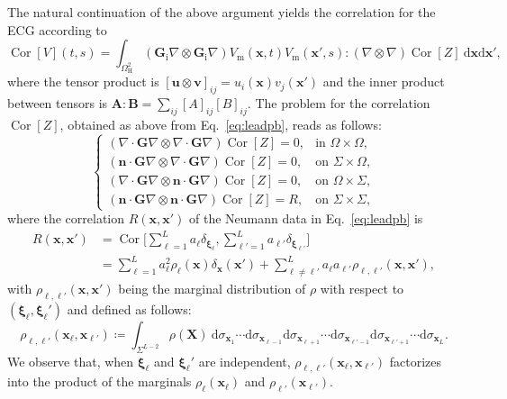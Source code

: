 \documentclass[runningheads]{llncs}
\newcommand{\bs}[1]{\boldsymbol{#1}}
\newcommand{\Vm}{V_\mathrm{m}}
\newcommand{\vX}{\mathbf{X}}
\newcommand{\vx}{\mathbf{x}}
\newcommand{\vn}{\mathbf{n}}
\newcommand{\tG}{\mathbf{G}}
\newcommand{\tGi}{\tG_\mathrm{i}}
\newcommand{\dd}{\mathrm{d}}
\newcommand{\OmegaH}{\Omega_\mathrm{H}}
\DeclareMathOperator{\Cor}{Cor}
\begin{document}
The natural continuation of the above argument yields the correlation for
the ECG according to
\[
\Cor[V](t,s) 
= \int_{\OmegaH^2} (\tGi\nabla\otimes\tGi\nabla) \Vm(\vx,t)\Vm(\vx',s)
: (\nabla\otimes\nabla) \Cor[Z]\: \dd\vx\dd\vx',
\]
where the tensor product is $[\mathbf{u}\otimes\mathbf{v}]_{ij} = u_i(\vx)
v_j(\vx')$ and the inner product between tensors is $\mathbf{A}:\mathbf{B}
= \sum_{ij} [A]_{ij} [B]_{ij}$.  The problem for the correlation $\Cor[Z]$,
obtained as above from Eq.~\eqref{eq:leadpb}, reads as follows:
\begin{equation}\label{eq:leadpb_cor}
\begin{cases}
(\nabla\cdot\tG\nabla\otimes \nabla\cdot\tG\nabla) \Cor[Z] = 0, & \text{in }
\Omega\times\Omega, \\
(\vn\cdot\tG\nabla \otimes \nabla\cdot\tG\nabla) \Cor[Z] = 0, &
\text{on } \Sigma\times\Omega, \\
(\nabla\cdot\tG\nabla \otimes \vn\cdot\tG\nabla) \Cor[Z] = 0, &
\text{on } \Omega\times\Sigma, \\
(\vn\cdot\tG\nabla \otimes \vn\cdot\tG\nabla) \Cor[Z] = R, &
\text{on }\Sigma\times\Sigma,
\end{cases}
\end{equation}
where the correlation $R(\vx,\vx')$ of the Neumann data in
Eq.~\eqref{eq:leadpb} is
\begin{equation}
\begin{split}
R(\vx,\vx') &= \Cor\biggl[\sum_{\ell=1}^L a_\ell \delta_{{\bs\xi}_\ell},
\sum_{\ell'=1}^L a_{\ell'} \delta_{{\bs\xi}_{\ell'}} \biggr] \\
&= \sum_{\ell=1}^L a_\ell^2 \rho_\ell(\vx)\delta_{\vx}(\vx')
+ \sum_{\ell\neq\ell'}^L a_\ell a_{\ell'} \rho_{\ell,\ell'}(\vx,\vx'),
\end{split}
\end{equation}
with $\rho_{\ell,\ell'}(\vx,\vx')$ being the marginal distribution
of $\rho$ with respect to $(\bs\xi_\ell,\bs\xi_\ell')$ and defined
as follows:
\begin{equation} \label{eq:margin2}
\rho_{\ell,\ell'}(\vx_\ell,\vx_{\ell'}) \coloneqq
\int_{\Sigma^{L-2}} \rho(\vX)\:\dd\sigma_{\vx_1}
\cdots \dd\sigma_{\vx_{\ell-1}}\dd\sigma_{\vx_{\ell+1}}
\cdots \dd\sigma_{\vx_{\ell'-1}}\dd\sigma_{\vx_{\ell'+1}}\cdots
\dd\sigma_{\vx_L}.
\end{equation}
We observe that, when $\bs\xi_\ell$ and $\bs\xi_\ell'$ are independent,
$\rho_{\ell,\ell'}(\vx_\ell,\vx_{\ell'})$ factorizes into the product
of the marginals $\rho_\ell(\vx_\ell)$ and $\rho_{\ell'}(\vx_{\ell'})$.
\end{document}
